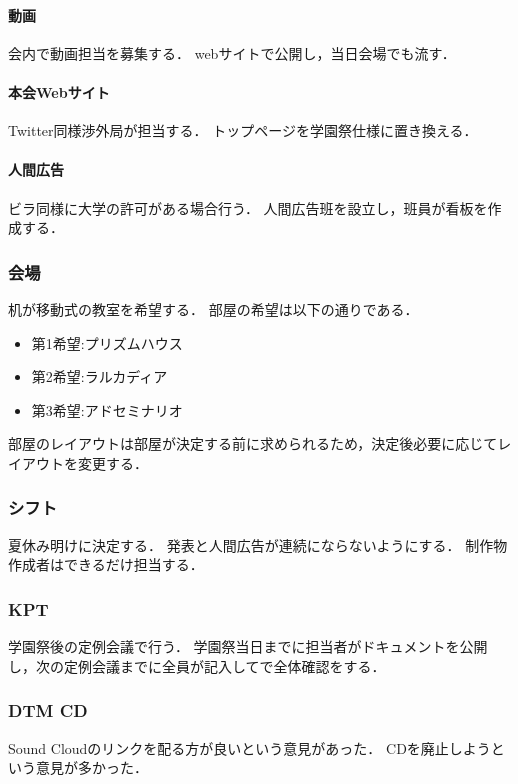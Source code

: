 \paragraph{動画}
会内で動画担当を募集する．
webサイトで公開し，当日会場でも流す．
\paragraph{本会Webサイト}
Twitter同様渉外局が担当する．
トップページを学園祭仕様に置き換える．
\paragraph{人間広告}         
ビラ同様に大学の許可がある場合行う．
人間広告班を設立し，班員が看板を作成する．

\subsubsection*{会場}
机が移動式の教室を希望する．
部屋の希望は以下の通りである．
\begin{itemize}
    \item 第1希望:プリズムハウス
    \item 第2希望:ラルカディア
    \item 第3希望:アドセミナリオ  
\end{itemize}
部屋のレイアウトは部屋が決定する前に求められるため，決定後必要に応じてレイアウトを変更する．
    
\subsubsection*{シフト}
夏休み明けに決定する．
発表と人間広告が連続にならないようにする．
制作物作成者はできるだけ担当する．

\subsubsection*{KPT}
学園祭後の定例会議で行う．
学園祭当日までに担当者がドキュメントを公開し，次の定例会議までに全員が記入してで全体確認をする．

\subsubsection*{DTM CD}
Sound Cloudのリンクを配る方が良いという意見があった．
CDを廃止しようという意見が多かった．

